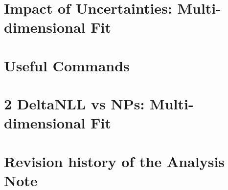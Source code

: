 \documentclass[11pt,twoside,a4paper,an]{cms-tdr}
\begin{document}
\section{Impact of Uncertainties: Multi-dimensional Fit}

\label{s:secNuisImpact}

\newpage
\section{Useful Commands}

\label{a:appendCommand}

\newpage
\section{2 DeltaNLL vs NPs: Multi-dimensional Fit}

\label{a:appendScanNuis}
\newpage
\section{Revision history of the Analysis Note}
\label{s:secChanges}

\end{document}
